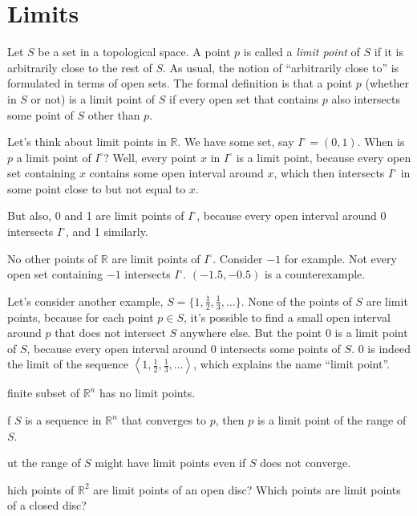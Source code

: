 \documentclass{article}
\def\R{{\mathbb R}}
\def\Rn{{\R^n}}
\newcounter{exercisecounter}\setcounter{exercisecounter}{1}
\def\Exercise.#1\par{{\item\small \makebox{\bf Exercise \number\theexercisecounter.\hspace{0.5em}}\unskip\ignorespaces#1\addtocounter{exercisecounter}{1}}}
\begin{document}
\section*{Limits}

Let $S$ be a set in a topological space.  A point $p$ is called a {\em
  limit point\/} of $S$ if it is arbitrarily close to the rest of $S$.
As usual, the notion of ``arbitrarily close to'' is formulated in
terms of open sets.  The formal definition is that a point $p$
(whether in $S$ or not) is a limit point of $S$ if every open set that
contains $p$ also intersects some point of $S$ other than $p$.

Let's think about limit points in $\R$.  We have some set, say
$I^\circ = (0,1)$.  When is $p$ a limit point of $I^\circ$?  Well, every point
$x$ in $I^\circ$ is a limit point, because every open set containing
$x$ contains some open interval around $x$, which then intersects
$I^\circ$ in some point close to but not equal to $x$.

But also, 0 and 1 are limit points of $I^\circ$, because every open
interval around 0 intersects $I^\circ$, and 1 similarly.

No other points of $\R$ are limit points of $I^\circ$.  Consider $-1$
for example.  Not every open set containing $-1$ intersects $I^\circ$.
$(-1.5, -0.5)$ is a counterexample.


Let's consider another example, $S = \{1, \frac12, \frac13, \ldots\}$. 
None of the points of $S$ are limit points, because for each
point $p\in S$, it's possible to find a small open interval around $p$
that does not intersect $S$ anywhere else.  But the point 0 is a limit
point of $S$, because every open interval around 0 intersects some
points of $S$.  0 is indeed the limit of the sequence $\left< 1, \frac12,
\frac13, \ldots\right>$, which explains the name ``limit point''.

\begin{itemize}
\Exercise. A finite subset of $\R^n$ has no limit points.

\Exercise. If $S$ is a sequence in $\Rn$ that converges to $p$, then $p$
is a limit point of the range of $S$.

\Exercise. But the range of $S$ might have limit points even if $S$ does not converge.

\Exercise. Which points of $\R^2$ are limit points of an open disc?
Which points are limit points of a closed disc?

\end{itemize}
\end{document}
